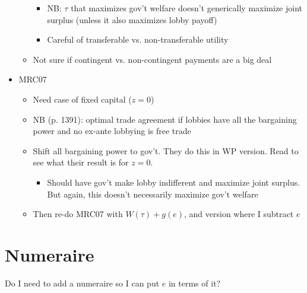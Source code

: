 \documentclass[12pt]{article}
\begin{document}
\begin{itemize}
\begin{itemize}
					\begin{itemize}
						\item NB: $\tau$ that maximizes gov't welfare doesn't generically maximize joint surplus (unless it also maximizes lobby payoff)
						\item Careful of transferable vs. non-transferable utility
					\end{itemize}
				\item Not sure if contingent vs. non-contingent payments are a big deal
			\end{itemize}
		\item MRC07
			\begin{itemize}
				\item Need case of fixed capital ($z=0$)
				\item NB (p. 1391): optimal trade agreement if lobbies have all the bargaining power and no ex-ante lobbying is free trade
				\item Shift all bargaining power to gov't. They do this in WP version. Read to see what their result is for $z=0$.
					\begin{itemize}
						\item Should have gov't make lobby indifferent and maximize joint surplus. But again, this doesn't necessarily maximize gov't welfare
					\end{itemize}
				\item Then re-do MRC07 with $W(\tau) + g(e)$, and version where I subtract $e$
			\end{itemize}
	\end{itemize}


\section{Numeraire}
Do I need to add a numeraire so I can put $e$ in terms of it?
\end{document}

